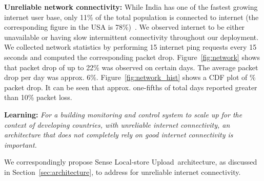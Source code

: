 \documentclass[10pt]{sensys-proc}
\newcommand{\figref}[1]{Figure~\ref{#1}}
\newcommand{\secref}[1]{Section~\ref{#1}}
\newcommand{\paradigms}{Sense Local-store Upload~}
\newcommand{\selstups}{SLsU }
\begin{document}
\noindent \textbf{Unreliable network connectivity:} While India has one of the fastest growing internet user base, only 11\% of the total population is connected to internet (the corresponding figure in the USA is 78\%)~\cite{meyer}. %
We observed internet to be either unavailable or having slow intermittent connectivity throughout our deployment. We collected network statistics by performing 15 internet ping requests every 15 seconds and computed the corresponding packet drop. \figref{fig:network} shows that packet drop of up to 22\% was observed on certain days. The average packet drop per day was approx. 6\%. \figref{fig:network_hist} shows a CDF plot of \% packet drop. It can be seen that approx. one-fifths of total days reported greater than 10\% packet loss. %

\textbf{Learning:} \emph{For a building monitoring and control system to scale up for the context of developing countries, with unreliable internet connectivity, an architecture that does not completely rely on good internet connectivity is important.} %
%

We correspondingly propose \paradigms architecture, as discussed in \secref{sec:architecture}, to address for unreliable internet connectivity.
\end{document}
